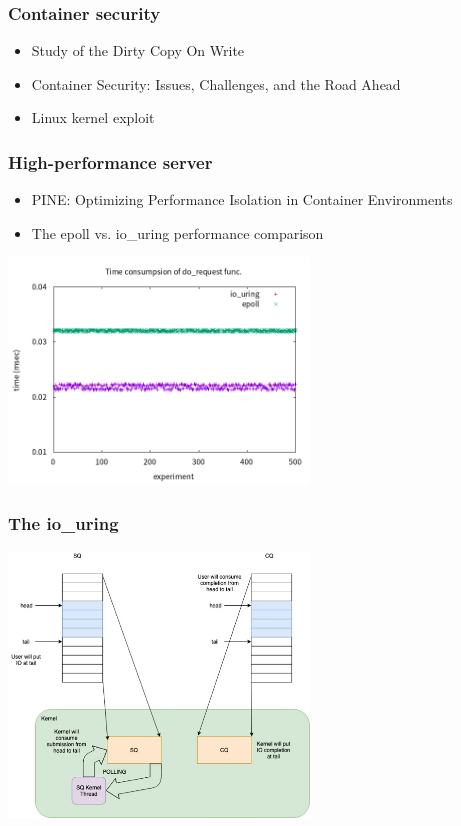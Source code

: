 \documentclass{beamer}
\begin{document}
\begin{frame}
    \frametitle{Container security}
    \begin{itemize}
        \item Study of the Dirty Copy On Write
        \item Container Security: Issues, Challenges, and the Road Ahead
        \item Linux kernel exploit
    \end{itemize}
\end{frame}

\begin{frame}
    \frametitle{High-performance server}
    \begin{itemize}
        \item PINE: Optimizing Performance Isolation in Container Environments
        \item The epoll vs. io\_uring performance comparison
    \end{itemize}
    \centering\includegraphics[width=0.6\textwidth]{io_uring.png}
\end{frame}

\begin{frame}
    \frametitle{The io\_uring }
    \centering\includegraphics[width=0.6\textwidth]{io_uring_arch.png}\cite{io_uring_seHTTPd}
\end{frame}
\end{document}
